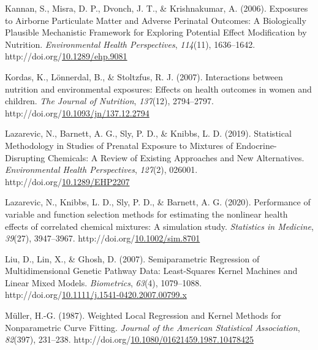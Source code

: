 \documentclass[12pt, twoside]{amherstthesis}
\newenvironment{CSLReferences}[2]%
  {}%
  {\par}
\begin{document}
\begin{CSLReferences}{1}{0}
\leavevmode{}%
Kannan, S., Misra, D. P., Dvonch, J. T., \& Krishnakumar, A. (2006). Exposures to {Airborne} {Particulate} {Matter} and {Adverse} {Perinatal} {Outcomes}: {A} {Biologically} {Plausible} {Mechanistic} {Framework} for {Exploring} {Potential} {Effect} {Modification} by {Nutrition}. \emph{Environmental Health Perspectives}, \emph{114}(11), 1636--1642. http://doi.org/\href{https://doi.org/10.1289/ehp.9081}{10.1289/ehp.9081}

\leavevmode{}%
Kordas, K., Lönnerdal, B., \& Stoltzfus, R. J. (2007). Interactions between nutrition and environmental exposures: Effects on health outcomes in women and children. \emph{The Journal of Nutrition}, \emph{137}(12), 2794--2797. http://doi.org/\href{https://doi.org/10.1093/jn/137.12.2794}{10.1093/jn/137.12.2794}

\leavevmode{}%
Lazarevic, N., Barnett, A. G., Sly, P. D., \& Knibbs, L. D. (2019). Statistical {Methodology} in {Studies} of {Prenatal} {Exposure} to {Mixtures} of {Endocrine}-{Disrupting} {Chemicals}: {A} {Review} of {Existing} {Approaches} and {New} {Alternatives}. \emph{Environmental Health Perspectives}, \emph{127}(2), 026001. http://doi.org/\href{https://doi.org/10.1289/EHP2207}{10.1289/EHP2207}

\leavevmode{}%
Lazarevic, N., Knibbs, L. D., Sly, P. D., \& Barnett, A. G. (2020). Performance of variable and function selection methods for estimating the nonlinear health effects of correlated chemical mixtures: {A} simulation study. \emph{Statistics in Medicine}, \emph{39}(27), 3947--3967. http://doi.org/\href{https://doi.org/10.1002/sim.8701}{10.1002/sim.8701}

\leavevmode{}%
Liu, D., Lin, X., \& Ghosh, D. (2007). Semiparametric {Regression} of {Multidimensional} {Genetic} {Pathway} {Data}: {Least}-{Squares} {Kernel} {Machines} and {Linear} {Mixed} {Models}. \emph{Biometrics}, \emph{63}(4), 1079--1088. http://doi.org/\href{https://doi.org/10.1111/j.1541-0420.2007.00799.x}{10.1111/j.1541-0420.2007.00799.x}

\leavevmode{}%
Müller, H.-G. (1987). Weighted {Local} {Regression} and {Kernel} {Methods} for {Nonparametric} {Curve} {Fitting}. \emph{Journal of the American Statistical Association}, \emph{82}(397), 231--238. http://doi.org/\href{https://doi.org/10.1080/01621459.1987.10478425}{10.1080/01621459.1987.10478425}


\end{CSLReferences}
\end{document}
